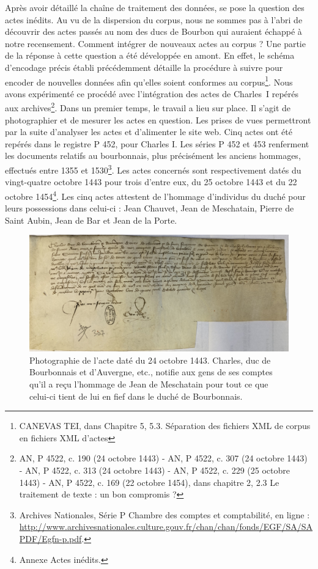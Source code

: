 \par Après avoir détaillé la chaîne de traitement des données, se pose la question des actes inédits. Au vu de la dispersion du corpus, nous ne sommes pas à l'abri de découvrir des actes passés au nom des ducs de Bourbon qui auraient échappé à notre recensement. Comment intégrer de nouveaux actes au corpus ? Une partie de la réponse à cette question a été développée en amont. En effet, le schéma d'encodage précis établi précédemment détaille la procédure à suivre pour encoder de nouvelles données afin qu'elles soient conformes au corpus\footnote{CANEVAS TEI, dans Chapitre 5, 5.3. Séparation des fichiers XML de corpus en fichiers XML d’actes}. Nous avons expérimenté ce procédé avec l'intégration des actes de Charles~I repérés aux archives\footnote{AN, P 4522, c. 190 (24 octobre 1443) - AN, P 4522, c. 307 (24 octobre 1443) - AN, P 4522, c. 313 (24 octobre 1443) - AN, P 4522, c. 229 (25 octobre 1443) - AN, P 4522, c. 169 (22 octobre 1454), dans chapitre 2, 2.3 Le traitement de texte : un bon compromis ?}. Dans un premier temps, le travail a lieu sur place. Il s'agit de photographier et de mesurer les actes en question. Les prises de vues permettront par la suite d'analyser les actes et d'alimenter le site web. Cinq actes ont été repérés dans le registre P 452, pour Charles I. Les séries P 452 et 453 renferment les documents relatifs au bourbonnais, plus précisément les anciens hommages, effectués entre 1355 et 1530\footnote{Archives Nationales, \og Série P Chambre des comptes et comptabilité\fg, en ligne : \url{http://www.archivesnationales.culture.gouv.fr/chan/chan/fonds/EGF/SA/SAPDF/Egfn-p.pdf}.}. Les actes concernés sont respectivement datés du vingt-quatre octobre 1443 pour trois d'entre eux, du 25 octobre 1443 et du 22 octobre 1454\footnote{Annexe Actes inédits.}. Les cinq actes attestent de l'hommage d'individus du duché pour leurs possessions dans celui-ci : Jean Chauvet, Jean de Meschatain, Pierre de Saint Aubin, Jean de Bar et Jean de la Porte. 
\newpage 

\begin{figure}[H]
    \centering
    \includegraphics[scale=0.115]{img/1443_10_24b.jpg}
    \caption{Photographie de l'acte daté du 24 octobre 1443. \newline Charles, duc de Bourbonnais et d'Auvergne, etc., notifie aux gens de ses comptes qu'il a reçu l'hommage de Jean de Meschatain pour tout ce que celui-ci tient de lui en fief dans le duché de Bourbonnais.}
    \label{fig:1443_10_24b}
\end{figure} 

